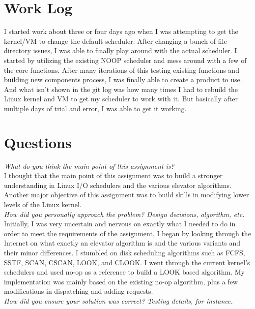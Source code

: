 \documentclass[letterpaper,10pt,titlepage]{article}
\begin{document}
\newpage

\section{Work Log}

I started work about three or four days ago when I was attempting to get the kernel/VM to change the default scheduler. After changing a bunch of file directory issues, I was able to finally play around with the actual scheduler.  I started by utilizing the existing NOOP scheduler and mess around with a few of the core functions. After many iterations of this testing existing functions and building new components process, I was finally able to create a product to use. And what isn't shown in the git log was how many times I had to rebuild the Linux kernel and VM to get my scheduler to work with it. But basically after multiple days of trial and error, I was able to get it working.

\section{Questions}

\textit{What do you think the main point of this assignment is?}\\

I thought that the main point of this assignment was to build a stronger understanding in Linux I/O schedulers and the various elevator algorithms. Another major objective of this assignment was to build skills in modifying lower levels of the Linux kernel.\\

\textit{How did you personally approach the problem? Design decisions, algorithm, etc.}\\

Initially, I was very uncertain and nervous on exactly what I needed to do in order to meet the requirements of the assignment. I began by looking through the Internet on what exactly an elevator algorithm is and the various variants and their minor differences. I stumbled on disk scheduling algorithms such as FCFS, SSTF, SCAN, CSCAN, LOOK, and CLOOK. I went through the current kernel's schedulers and used no-op as a reference to build a LOOK based algorithm. My implementation was mainly based on the existing no-op algorithm, plus a few modifications in dispatching and adding requests.\\

\textit{How did you ensure your solution was correct? Testing details, for instance.}\\
\end{document}
